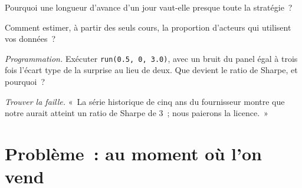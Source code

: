 \begin{exercise}[$\star\star$]\label{exo:s1:alternative-data-strategies:5}
Pourquoi une longueur d'avance d'un jour vaut-elle presque toute la stratégie~?
\end{exercise}

\begin{exercise}[$\star\star$]\label{exo:s1:alternative-data-strategies:6}
Comment estimer, à partir des seuls cours, la proportion d'acteurs qui utilisent vos données~?
\end{exercise}

\begin{exercise}[$\star\star\star$]\label{exo:s1:alternative-data-strategies:7}
\emph{Programmation.} Exécuter \texttt{run(0.5, 0, 3.0)}, avec un bruit du panel égal à trois fois l'écart type de la surprise au lieu de deux. Que devient le ratio de Sharpe, et pourquoi~?
\end{exercise}

\begin{exercise}[$\star\star\star$]\label{exo:s1:alternative-data-strategies:8}
\emph{Trouver la faille.} «~La série historique de cinq ans du fournisseur montre que notre  aurait atteint un ratio de Sharpe de 3~; nous paierons la licence.~»
\end{exercise}

\section{Problème~: au moment où l'on vend}

